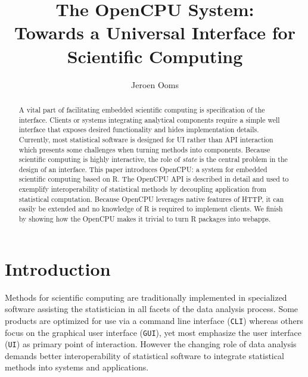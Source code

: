 \documentclass{article}
\author{Jeroen Ooms}
\title{The OpenCPU System:\\ Towards a Universal Interface for Scientific Computing}
\newcommand{\GUI}{\texttt{GUI}\xspace}
\newcommand{\CLI}{\texttt{CLI}\xspace}
\newcommand{\UI}{\texttt{UI}\xspace}
\newcommand{\API}{\texttt{API}\xspace}
\begin{document}
\maketitle

\begin{abstract}
A vital part of facilitating embedded scientific computing is specification of the interface. Clients or systems integrating analytical components require a simple well interface that exposes desired functionality and hides implementation details. Currently, most statistical software is designed for UI rather than API interaction which presents some challenges when turning methods into components. Because scientific computing is highly interactive, the role of \emph{state} is the central problem in the design of an interface. This paper introduces OpenCPU: a system for embedded scientific computing based on R. The OpenCPU API is described in detail and used to exemplify interoperability of statistical methods by decoupling application from statistical computation. Because OpenCPU leverages native features of HTTP, it can easily be extended and no knowledge of R is required to implement clients. We finish by showing how the OpenCPU makes it trivial to turn R packages into webapps.
\end{abstract}

\section{Introduction}

Methods for scientific computing are traditionally implemented in specialized software assisting the statistician in all facets of the data analysis process. Some products are optimized for use via a command line interface (\CLI) whereas others focus on the graphical user interface (\GUI), yet most emphasize the user interface (\UI) as primary point of interaction. However the changing role of data analysis demands better interoperability of statistical software to integrate statistical methods into systems and applications. 


\end{document}
